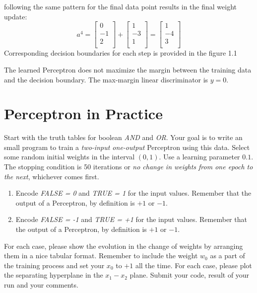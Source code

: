 \documentclass[12pt]{article}
\numberwithin{equation}{section}
\numberwithin{table}{section}
\numberwithin{figure}{section}
\begin{document}
following the same pattern for the final data point results in the final weight update:
$$
	a^4 = \begin{bmatrix}
	0 \\
	-1 \\
	2 \\
	\end{bmatrix} + \begin{bmatrix}
	1 \\
	-3 \\
	1 \\
	\end{bmatrix} = \begin{bmatrix}
	1 \\
	-4 \\
	3 \\
	\end{bmatrix}
$$
Corresponding decision boundaries for each step is provided in the figure 1.1


The learned Perceptron does not maximize the margin between the training data and the decision boundary. The max-margin linear discriminator is $y = 0$.
\section{Perceptron in Practice}
Start with the truth tables for boolean \textit{AND} and \textit{OR}. Your goal is to write an small program to train a \textit{two-input one-output} Perceptron using this data. Select some random initial weights in the interval $(0, 1)$. Use a learning parameter $0.1$. The stopping condition is 50 iterations or \textit{no change in weights from one epoch to the next}, whichever comes first.
\begin{enumerate}[label=(\alph*)]
	\item Encode \textit{FALSE = 0} and \textit{TRUE = 1} for the input values. Remember that the output of a Perceptron, by definition is $+1$ or $-1$.
	\item Encode \textit{FALSE = -1} and \textit{TRUE = +1} for the input values. Remember that the output of a Perceptron, by definition is $+1$ or $-1$.
\end{enumerate}
For each case, please show the evolution in the change of weights by arranging them in a nice tabular format. Remember to include the weight $w_0$ as a part of the training process and set your $x_0$ to $+1$ all the time. For each case, please plot the separating hyperplane in the $x_1-x_2$ plane. Submit your code, result of your run and your comments.
\end{document}

